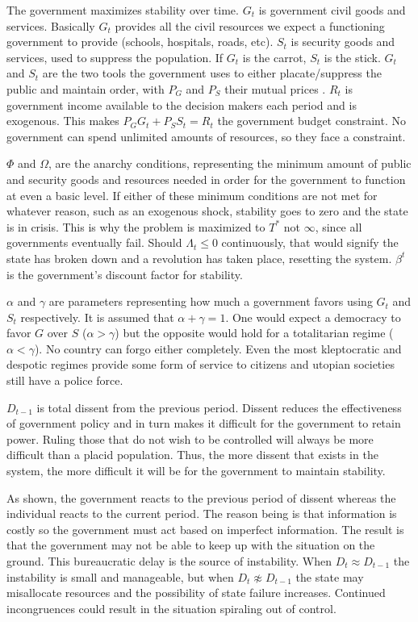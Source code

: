 \documentclass[12pt]{article}
\begin{document}
\begin{spacing}{1.5}
The government maximizes stability over time. $G_t$ is government civil goods and services. Basically $G_t$ provides all the civil resources we expect a functioning government to provide (schools, hospitals, roads, etc). $S_t$ is security goods and services, used to suppress the population. If $G_t$ is the carrot, $S_t$ is the stick. $G_t$ and $S_t$ are the two tools the government uses to either placate/suppress the public and maintain order, with $P_G$ and $P_S$ their mutual prices . $R_t$ is government income available to the decision makers each period and is exogenous. This makes $P_G G_t+P_S S_t=R_t$ the government budget constraint. No government can spend unlimited amounts of resources, so they face a constraint. 

$\Phi$ and $\Omega$, are the anarchy conditions, representing the minimum amount of public and security goods and resources needed in order for the government to function at even a basic level. If either of these minimum conditions are not met for whatever reason, such as an exogenous shock, stability goes to zero and the state is in crisis. This is why the problem is maximized to $T^*$ not $\infty$, since all governments eventually fail. Should $\Lambda_t \leq 0$ continuously, that would signify the state has broken down and a revolution has taken place, resetting the system. $\beta^t$ is the government's discount factor for stability. 

$\alpha$ and $\gamma $ are parameters representing how much a government favors using $G_t$ and $S_t$ respectively. It is assumed that $\alpha+\gamma=1$. One would expect a democracy to favor $G$ over $S$ ($\alpha > \gamma$) but the opposite would hold for a totalitarian regime ($\alpha < \gamma $). No country can forgo either completely. Even the most kleptocratic and despotic regimes provide some form of service to citizens and utopian societies still have a police force.

$D_{t-1}$ is total dissent from the previous period. Dissent reduces the effectiveness of government policy and in turn makes it difficult for the government to retain power. Ruling those that do not wish to be controlled will always be more difficult than a placid population. Thus, the more dissent that exists in the system, the more difficult it will be for the government to maintain stability.  

As shown, the government reacts to the previous period of dissent whereas the individual reacts to the current period. The reason being is that information is costly so the government must act based on imperfect information. The result is that the government may not be able to keep up with the situation on the ground. This bureaucratic delay is the source of instability. When $D_t \approx D_{t-1}$ the instability is small and manageable, but when $D_t \not\approx D_{t-1}$ the state may misallocate resources and the possibility of state failure increases. Continued incongruences could result in the situation spiraling out of control. 


\end{spacing}
\end{document}

